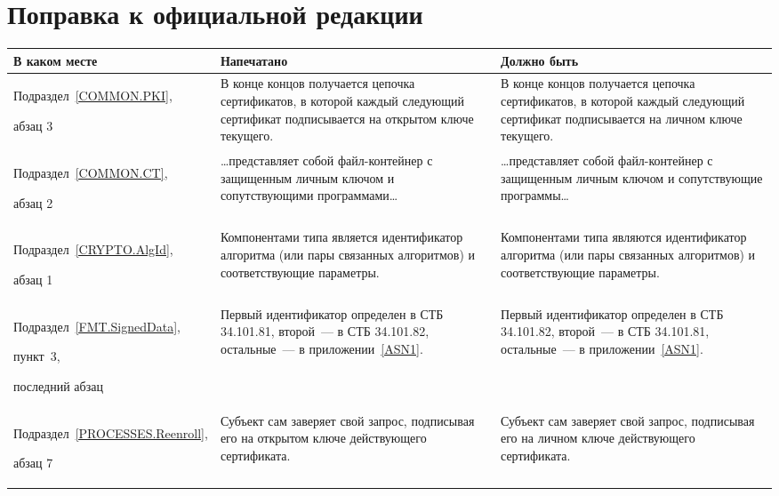 \clearpage
\chapter*{\mbox{}\hfill Поправка к официальной редакции\hfill\mbox{}}

\mbox{}

{\small
\begin{center}
\begin{tabular}{|p{3cm}|p{6.3cm}|p{6.4cm}|}
\hline
В каком месте & Напечатано & Должно быть\\
\hline
\hline
Подраздел~\ref{COMMON.PKI},\par 
абзац 3
&
В конце концов получается цепочка сертификатов, в которой каждый следующий 
сертификат подписывается на открытом ключе текущего.
&
В конце концов получается цепочка сертификатов, в которой каждый следующий 
сертификат подписывается на личном ключе текущего.
\\
\hline
Подраздел~\ref{COMMON.CT},\par 
абзац 2
&
\ldots представляет собой файл-контейнер с защищенным личным 
ключом и сопутствующими программами\ldots
&
\ldots представляет собой файл-контейнер с защищенным личным 
ключом и сопутствующие программы\ldots
\\
\hline
Подраздел~\ref{CRYPTO.AlgId},\par 
абзац 1
&
Компонентами типа является идентификатор алгоритма (или пары 
связанных алгоритмов) и соответствующие параметры. 
&
Компонентами типа являются идентификатор алгоритма (или пары 
связанных алгоритмов) и соответствующие параметры. 
\\
\hline
Подраздел~\ref{FMT.SignedData},\par пункт~3,\par 
последний абзац 
&
Первый идентификатор определен в СТБ 34.101.81, второй~--- в СТБ 
34.101.82, остальные~--- в приложении~\ref{ASN1}.
&
Первый идентификатор определен в СТБ 34.101.82, второй~--- в СТБ 
34.101.81, остальные~--- в приложении~\ref{ASN1}.
\\
\hline
Подраздел~\ref{PROCESSES.Reenroll},\par 
абзац 7
&
Субъект сам заверяет свой запрос, подписывая его на открытом ключе 
действующего сертификата.
&
Субъект сам заверяет свой запрос, подписывая его на личном ключе 
действующего сертификата.
\\
\hline
\end{tabular}
\end{center}
}